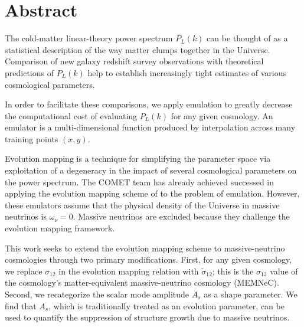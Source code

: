 

\chapter*{Abstract}

\begin{comment}
The color code in this document: \textcolor{blue}{Explanations to the
proofreader; we'll simply cut these out shortly before submission.}
\textcolor{orange}{Notes to myself--I don't need input here, I just need time
to plan and execute.} \textcolor{green}{I need to add citations / 
justification for the claims here, either by generating more plots or by going
back and looking through the papers I used to get started with this project.}
\textcolor{red}{I have some confusion about this area and I would appreciate
feedback from the proofreader.}
\end{comment}

The cold-matter linear-theory power spectrum $P_L (k)$ can be thought of as
a statistical description of the way matter clumps together in the Universe.
Comparison of new galaxy redshift survey observations with theoretical 
predictions of $P_L(k)$ help to establish increasingly tight estimates of 
various cosmological parameters.

In order to facilitate these comparisons, we apply emulation to greatly
decrease the computational cost of evaluating $P_L (k)$ for any given
cosmology. An emulator is a multi-dimensional function produced by 
interpolation across many training points $(x, y)$.

Evolution mapping is a technique for simplifying the parameter space via
exploitation of a degeneracy in the impact of several cosmological parameters
on the power spectrum. The COMET team has already achieved successed in
applying the evolution mapping scheme of \citet{San21} to the problem of
emulation. However, these emulators assume that the physical density of the
Universe in massive neutrinos is $\omega_\nu = 0$. Massive neutrinos are 
excluded because they challenge the evolution mapping framework.

This work seeks to extend the evolution mapping scheme to massive-neutrino 
cosmologies through two primary modifications. First, for any given cosmology,
we replace $\sigma_{12}$ in the evolution mapping relation with
$\tilde{\sigma}_{12}$; this is the $\sigma_{12}$ value of the cosmology's
matter-equivalent massive-neutrino cosmology (MEMNeC).
Second, we recategorize the scalar mode amplitude $A_s$ as a shape parameter.
We find that $A_s$, which is traditionally treated as an evolution parameter, 
can be used to quantify the suppression of structure growth due to massive 
neutrinos.


